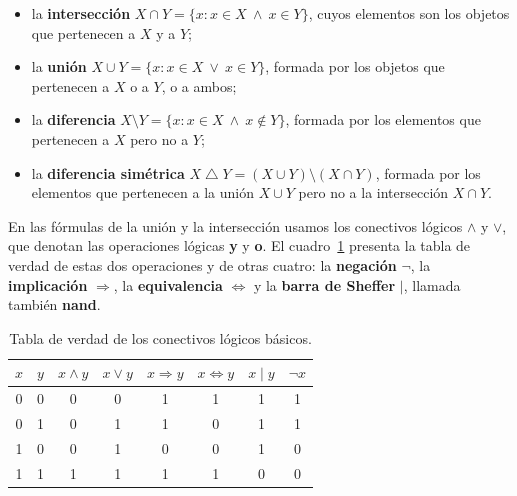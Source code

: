 \begin{itemize}
    \item la \textbf{intersección} $X \cap Y = \{x : x \in X \ \wedge \ x \in Y\}$, cuyos elementos son los
          objetos que pertenecen a $X$ y a $Y$;
    \item la \textbf{unión} $X \cup Y = \{x : x \in X \ \vee \ x \in Y\}$, formada por los objetos que pertenecen a
          $X$ o a $Y$, o a ambos;
    \item la \textbf{diferencia} $X \setminus Y = \{x : x \in X \ \wedge \ x \notin Y\}$, formada por los
          elementos que pertenecen a $X$ pero no a $Y$;
    \item la \textbf{diferencia simétrica} $X \mathbin{\triangle} Y = (X \cup Y) \setminus (X \cap
              Y)$, formada por los elementos que pertenecen a la unión $X \cup Y$ pero no a la intersección $X \cap Y$.
\end{itemize}

En las fórmulas de la unión y la intersección usamos los conectivos lógicos $\wedge$ y $\vee$, que denotan las
operaciones lógicas \textbf{y} y \textbf{o}. El cuadro~\ref{tab:tabla-verdad} presenta la tabla de verdad de estas dos
operaciones y de otras cuatro: la \textbf{negación} $\neg$, la \textbf{implicación}
$\Rightarrow$, la \textbf{equivalencia} $\Leftrightarrow$ y la \textbf{barra de
    Sheffer} $\mid$, llamada también \textbf{nand}.

\begin{table}[htbp]
    \centering
    \caption{Tabla de verdad de los conectivos lógicos básicos.}
    \label{tab:tabla-verdad}
    \begin{tabular}{cc cccccc}
        \toprule
        $x$ & $y$ & $x \wedge y$ & $x \vee y$ & $x \Rightarrow y$ & $x \Leftrightarrow y$ & $x \mid y$ & $\neg x$ \\
        \midrule
        0   & 0   & 0            & 0          & 1                 & 1                     & 1          & 1        \\
        0   & 1   & 0            & 1          & 1                 & 0                     & 1          & 1        \\
        1   & 0   & 0            & 1          & 0                 & 0                     & 1          & 0        \\
        1   & 1   & 1            & 1          & 1                 & 1                     & 0          & 0        \\
        \bottomrule
    \end{tabular}
\end{table}

